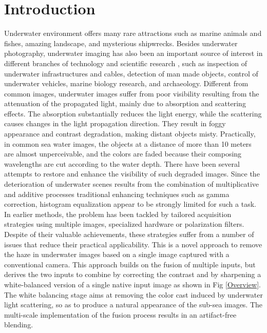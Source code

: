\documentclass[hidelinks, 12pt]{report}
\begin{document}
\chapter{Introduction}
\fancyhf{}
\fancyhead[r]{%
   \itshape
\footnotesize{\chaptermark}
   \leftmark}
\fancyfoot[RE,RO]{\footnotesize\thepage}
\justify
Underwater environment offers many rare attractions such as marine animals and fishes, amazing landscape, and mysterious shipwrecks. Besides underwater photography, underwater imaging has also been an important source of interest in different branches of technology and scientific research \cite{md}, such as inspection of underwater infrastructures \cite{inf} and cables, detection of man made objects, control of underwater vehicles, marine biology research, and archaeology. Different from common images, underwater images suffer from poor visibility resulting from the attenuation of the propagated light, mainly due to absorption and scattering effects. The absorption substantially reduces the light energy, while the scattering causes changes in the light propagation direction. They result in foggy appearance and contrast degradation, making distant objects misty. Practically, in common sea water images, the objects at a distance of more than 10 meters are almost unperceivable, and the colors are faded because their composing wavelengths are cut according to the water depth. There have been several attempts to restore and enhance the visibility of such degraded images. Since the deterioration of underwater scenes results from the combination of multiplicative and additive processes \cite{UIP} traditional enhancing techniques such as gamma correction, histogram equalization appear to be strongly limited for such a task. In earlier methods, the problem has been tackled by tailored acquisition strategies using multiple images, specialized hardware\cite{md} or polarization filters. Despite of their valuable achievements, these strategies suffer from a number of issues that reduce their practical applicability. This is a novel approach to remove the haze in underwater images based on a single image captured with a conventional camera. This approach builds on the fusion of multiple inputs, but derives the two inputs to combine by correcting the contrast and by sharpening a white-balanced version of a single native input image as shown in Fig \ref{Overview}. The white balancing stage aims at removing the color cast induced by underwater light scattering, so as to produce a natural appearance of the sub-sea images. The multi-scale implementation of the fusion process results in an artifact-free blending.
\end{document}
